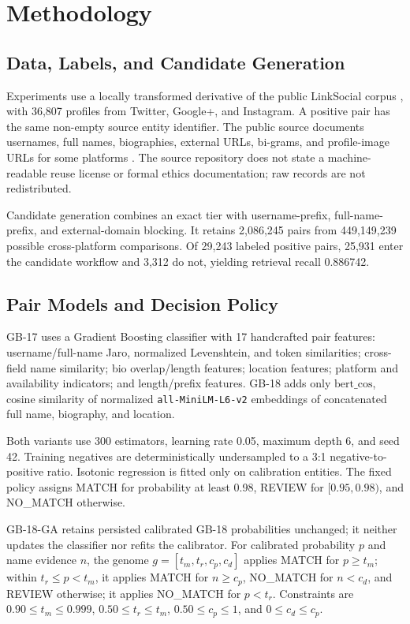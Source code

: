 \documentclass[conference]{IEEEtran}
\begin{document}
\section{Methodology}
\subsection{Data, Labels, and Candidate Generation}
Experiments use a locally transformed derivative of the public LinkSocial corpus \cite{sharma2018linksocial}, with 36,807 profiles from Twitter, Google+, and Instagram. A positive pair has the same non-empty source entity identifier. The public source documents usernames, full names, biographies, external URLs, bi-grams, and profile-image URLs for some platforms \cite{sharma2018linksocial}. The source repository does not state a machine-readable reuse license or formal ethics documentation; raw records are not redistributed.

Candidate generation combines an exact tier with username-prefix, full-name-prefix, and external-domain blocking. It retains 2,086,245 pairs from 449,149,239 possible cross-platform comparisons. Of 29,243 labeled positive pairs, 25,931 enter the candidate workflow and 3,312 do not, yielding retrieval recall 0.886742.

\subsection{Pair Models and Decision Policy}
GB-17 uses a Gradient Boosting classifier with 17 handcrafted pair features: username/full-name Jaro, normalized Levenshtein, and token similarities; cross-field name similarity; bio overlap/length features; location features; platform and availability indicators; and length/prefix features. GB-18 adds only $\mathrm{bert\_cos}$, cosine similarity of normalized \texttt{all-MiniLM-L6-v2} embeddings of concatenated full name, biography, and location.

Both variants use 300 estimators, learning rate 0.05, maximum depth 6, and seed 42. Training negatives are deterministically undersampled to a 3:1 negative-to-positive ratio. Isotonic regression is fitted only on calibration entities. The fixed policy assigns MATCH for probability at least 0.98, REVIEW for $[0.95,0.98)$, and NO\_MATCH otherwise.

GB-18-GA retains persisted calibrated GB-18 probabilities unchanged; it neither updates the classifier nor refits the calibrator. For calibrated probability $p$ and name evidence $n$, the genome $g=[t_m,t_r,c_p,c_d]$ applies MATCH for $p\geq t_m$; within $t_r\leq p<t_m$, it applies MATCH for $n\geq c_p$, NO\_MATCH for $n<c_d$, and REVIEW otherwise; it applies NO\_MATCH for $p<t_r$. Constraints are $0.90\leq t_m\leq0.999$, $0.50\leq t_r\leq t_m$, $0.50\leq c_p\leq1$, and $0\leq c_d\leq c_p$.
\end{document}
